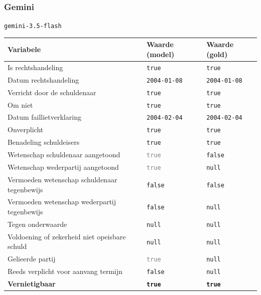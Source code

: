 \documentclass[
  dutch,
  a4paper,
]{article}
\begin{document}
\newpage


\subsubsection{Gemini}\label{gemini-17}

\texttt{gemini-3.5-flash}

\begin{center}
\small
\begin{tabular}{@{}p{7.4cm}p{2.6cm}p{2.6cm}@{}}
\toprule
Variabele & Waarde (model) & Waarde (gold) \\
\midrule
Is rechtshandeling & \texttt{true} & \texttt{true} \\
Datum rechtshandeling & \texttt{2004-01-08} & \texttt{2004-01-08} \\
Verricht door de schuldenaar & \texttt{true} & \texttt{true} \\
Om niet & \texttt{true} & \texttt{true} \\
Datum faillietverklaring & \texttt{2004-02-04} & \texttt{2004-02-04} \\
Onverplicht & \texttt{true} & \texttt{true} \\
Benadeling schuldeisers & \texttt{true} & \texttt{true} \\
Wetenschap schuldenaar aangetoond & \textcolor{gray}{\texttt{true}} & \texttt{false} \\
Wetenschap wederpartij aangetoond & \textcolor{gray}{\texttt{true}} & \texttt{null} \\
Vermoeden wetenschap schuldenaar tegenbewijs & \texttt{false} & \texttt{false} \\
Vermoeden wetenschap wederpartij tegenbewijs & \texttt{false} & \texttt{null} \\
Tegen onderwaarde & \texttt{null} & \texttt{null} \\
Voldoening of zekerheid niet opeisbare schuld & \texttt{null} & \texttt{null} \\
Gelieerde partij & \textcolor{gray}{\texttt{true}} & \texttt{null} \\
Reeds verplicht voor aanvang termijn & \texttt{false} & \texttt{null} \\
\textbf{Vernietigbaar} & \textbf{\texttt{true}} & \textbf{\texttt{true}} \\
\bottomrule
\end{tabular}
\end{center}
\end{document}
